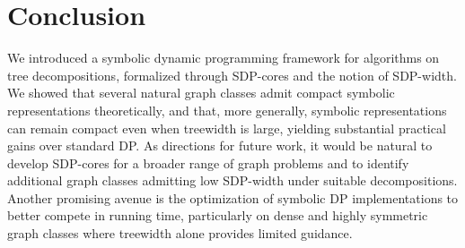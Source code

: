 \section{Conclusion}

We introduced a symbolic dynamic programming framework for algorithms on tree
decompositions, formalized through SDP-cores and the notion of SDP-width. We
showed that several natural graph classes admit compact symbolic representations
theoretically, and that, more generally, symbolic representations can remain
compact even when treewidth is large, yielding substantial practical gains over
standard DP. As directions for future work, it would be natural
to develop SDP-cores for a broader range of graph problems and to identify
additional graph classes admitting low SDP-width under suitable decompositions.
Another promising avenue is the optimization of symbolic DP implementations to
better compete in running time, particularly on dense and highly symmetric graph
classes where treewidth alone provides limited guidance.
